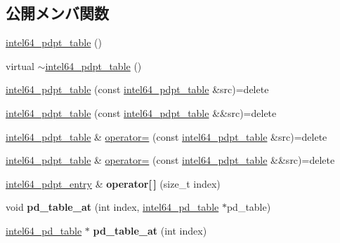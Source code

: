 \subsection*{公開メンバ関数}
\begin{DoxyCompactItemize}
\item 
\hyperlink{classintel64__pdpt__table_a3cd9c879e84fce667318df399142efd4}{intel64\+\_\+pdpt\+\_\+table} ()
\item 
virtual \hyperlink{classintel64__pdpt__table_af88987688b73d5a7629df995fea538a9}{$\sim$intel64\+\_\+pdpt\+\_\+table} ()
\item 
\hyperlink{classintel64__pdpt__table_aa5679547ca3652a67ab58dad5280f7f4}{intel64\+\_\+pdpt\+\_\+table} (const \hyperlink{classintel64__pdpt__table}{intel64\+\_\+pdpt\+\_\+table} \&src)=delete
\item 
\hyperlink{classintel64__pdpt__table_adef3862481b45bfc4f9e1bf3e592655e}{intel64\+\_\+pdpt\+\_\+table} (const \hyperlink{classintel64__pdpt__table}{intel64\+\_\+pdpt\+\_\+table} \&\&src)=delete
\item 
\hyperlink{classintel64__pdpt__table}{intel64\+\_\+pdpt\+\_\+table} \& \hyperlink{classintel64__pdpt__table_a8faa68e17a871f951674ca7c7d42a60c}{operator=} (const \hyperlink{classintel64__pdpt__table}{intel64\+\_\+pdpt\+\_\+table} \&src)=delete
\item 
\hyperlink{classintel64__pdpt__table}{intel64\+\_\+pdpt\+\_\+table} \& \hyperlink{classintel64__pdpt__table_a6f2a9aa341261354835c89972c341007}{operator=} (const \hyperlink{classintel64__pdpt__table}{intel64\+\_\+pdpt\+\_\+table} \&\&src)=delete
\item 
\hypertarget{classintel64__pdpt__table_a6712cc312b62224c69b992e3773ac919}{}\label{classintel64__pdpt__table_a6712cc312b62224c69b992e3773ac919} 
\hyperlink{classintel64__pdpt__entry}{intel64\+\_\+pdpt\+\_\+entry} \& {\bfseries operator\mbox{[}$\,$\mbox{]}} (size\+\_\+t index)
\item 
\hypertarget{classintel64__pdpt__table_a94bd6a80ab20c8de937a4b6d608a6a92}{}\label{classintel64__pdpt__table_a94bd6a80ab20c8de937a4b6d608a6a92} 
void {\bfseries pd\+\_\+table\+\_\+at} (int index, \hyperlink{classintel64__pd__table}{intel64\+\_\+pd\+\_\+table} $\ast$pd\+\_\+table)
\item 
\hypertarget{classintel64__pdpt__table_a079c8439f4e7091d4a9b043574a185c6}{}\label{classintel64__pdpt__table_a079c8439f4e7091d4a9b043574a185c6} 
\hyperlink{classintel64__pd__table}{intel64\+\_\+pd\+\_\+table} $\ast$ {\bfseries pd\+\_\+table\+\_\+at} (int index)
\end{DoxyCompactItemize}
